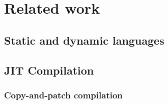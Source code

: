 \chapter{Related work}
\label{chap:related-work}

%
%




\section{Static and dynamic languages}
\label{sec:static-dynamic-languages}











\section{JIT Compilation}
\label{sec:jit-compilation}

\subsection{Copy-and-patch compilation}
\label{ssec:copy-and-patch-compilation}

